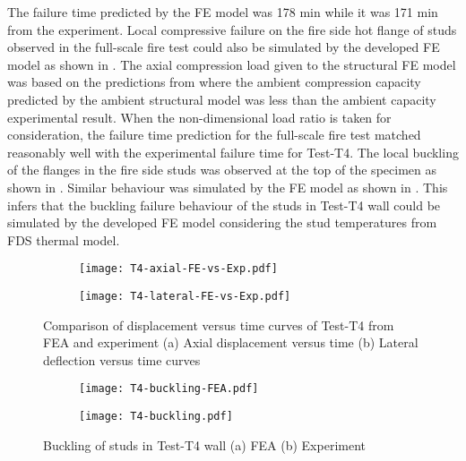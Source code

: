 The failure time predicted by the FE model was 178 min while it was 171 min from the experiment. Local compressive failure on the fire side hot flange of studs observed in the full-scale fire test could also be simulated by the developed FE model as shown in . The axial compression load given to the structural FE model was based on the predictions from  where the ambient compression capacity predicted by the ambient structural model was less than the ambient capacity experimental result. When the non-dimensional load ratio is taken for consideration, the failure time prediction for the full-scale fire test matched reasonably well with the experimental failure time for Test-T4. The local buckling of the flanges in the fire side studs was observed at the top of the specimen as shown in . Similar behaviour was simulated by the FE model as shown in . This infers that the buckling failure behaviour of the studs in Test-T4 wall could be simulated by the developed FE model considering the stud temperatures from FDS thermal model. 
\begin{figure}[!htbp]
	\centering
	\begin{subfigure}[b]{0.7\textwidth}
		\centering
		\texttt{[image: T4-axial-FE-vs-Exp.pdf]}
		\caption{}
		\label{subfig:T4-axial-FE-vs-Exp}
	\end{subfigure}
	\begin{subfigure}[b]{0.7\textwidth}
		\centering
		\texttt{[image: T4-lateral-FE-vs-Exp.pdf]}
		\caption{}
		\label{subfig:T4-lateral-FE-vs-Exp}
	\end{subfigure}
	   \caption{Comparison of displacement versus time curves of Test-T4 from FEA and experiment (a) Axial displacement versus time (b) Lateral deflection versus time curves}
	   \label{fig:T4-structural-FE-vs-Exp}
\end{figure} 
\begin{figure}[!htbp]
	\centering
	\begin{subfigure}[b]{0.8\textwidth}
		\centering
		\texttt{[image: T4-buckling-FEA.pdf]}
		\caption{}
		\label{subfig:T4-buckling-FEA}
	\end{subfigure}
	\begin{subfigure}[b]{0.45\textwidth}
		\centering
		\texttt{[image: T4-buckling.pdf]}
		\caption{}
		\label{subfig:T4-buckling-FEA-Exp}
	\end{subfigure}
	   \caption{Buckling of studs in Test-T4 wall (a) FEA (b) Experiment}
	   \label{fig:T4-buckling-FE-vs-Exp}
\end{figure} 

